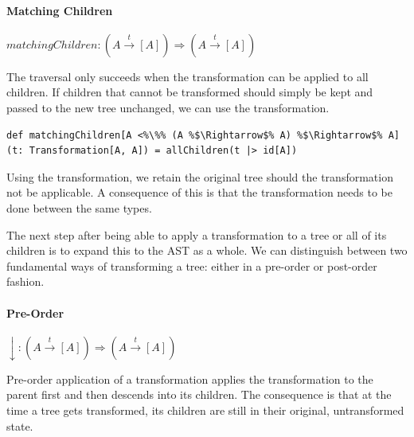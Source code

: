 \paragraph{Matching Children} \hfill $matchingChildren: (A \overset{t}{\rightarrow} [A]) \Rightarrow (A \overset{t}{\rightarrow} [A])$

\vspace{7pt} The  traversal only succeeds when the transformation can be applied to all children. If children that cannot be transformed should simply be kept and passed to the new tree unchanged, we can use the  transformation.

\begin{lstlisting}
def matchingChildren[A <%\%% (A %$\Rightarrow$% A) %$\Rightarrow$% A](t: Transformation[A, A]) = allChildren(t |> id[A])
\end{lstlisting}

Using the  transformation, we retain the original tree should the transformation not be applicable. A consequence of this is that the transformation needs to be done between the same types.



The next step after being able to apply a transformation to a tree or all of its children is to expand this to the AST as a whole. We can distinguish between two fundamental ways of transforming a tree: either in a pre-order or post-order fashion.

\paragraph{Pre-Order} \hfill $\downarrow: (A \overset{t}{\rightarrow} [A]) \Rightarrow (A \overset{t}{\rightarrow} [A])$

\vspace{7pt} Pre-order application of a transformation applies the transformation to the parent first and then descends into its children. The consequence is that at the time a tree gets transformed, its children are still in their original, untransformed state.


